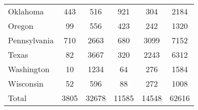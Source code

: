 \begin{tabular}{l*{5}{c}}
Oklahoma    &         443&         516&         921&         304&        2184\\
Oregon      &          99&         556&         423&         242&        1320\\
Pennsylvania&         710&        2663&         680&        3099&        7152\\
Texas       &          82&        3667&         320&        2243&        6312\\
Washington  &          10&        1234&          64&         276&        1584\\
Wisconsin   &          52&         596&          88&         272&        1008\\
Total       &        3805&       32678&       11585&       14548&       62616\\
\bottomrule
\end{tabular}

